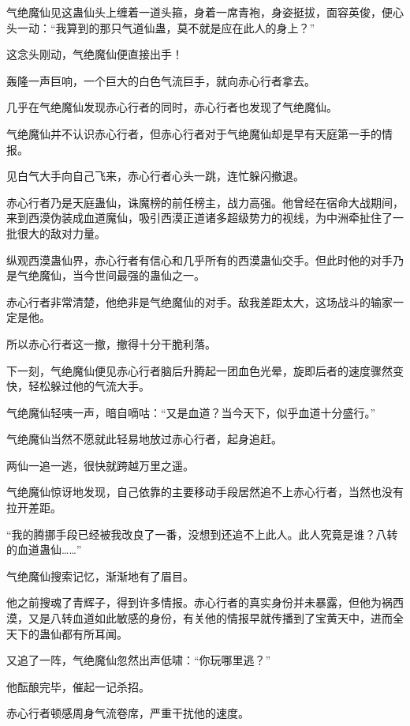 
\begin{this_body}

气绝魔仙见这蛊仙头上缠着一道头箍，身着一席青袍，身姿挺拔，面容英俊，便心头一动：“我算到的那只气道仙蛊，莫不就是应在此人的身上？”

这念头刚动，气绝魔仙便直接出手！

轰隆一声巨响，一个巨大的白色气流巨手，就向赤心行者拿去。

几乎在气绝魔仙发现赤心行者的同时，赤心行者也发现了气绝魔仙。

气绝魔仙并不认识赤心行者，但赤心行者对于气绝魔仙却是早有天庭第一手的情报。

见白气大手向自己飞来，赤心行者心头一跳，连忙躲闪撤退。

赤心行者乃是天庭蛊仙，诛魔榜的前任榜主，战力高强。他曾经在宿命大战期间，来到西漠伪装成血道魔仙，吸引西漠正道诸多超级势力的视线，为中洲牵扯住了一批很大的敌对力量。

纵观西漠蛊仙界，赤心行者有信心和几乎所有的西漠蛊仙交手。但此时他的对手乃是气绝魔仙，当今世间最强的蛊仙之一。

赤心行者非常清楚，他绝非是气绝魔仙的对手。敌我差距太大，这场战斗的输家一定是他。

所以赤心行者这一撤，撤得十分干脆利落。

下一刻，气绝魔仙便见赤心行者脑后升腾起一团血色光晕，旋即后者的速度骤然变快，轻松躲过他的气流大手。

气绝魔仙轻咦一声，暗自嘀咕：“又是血道？当今天下，似乎血道十分盛行。”

气绝魔仙当然不愿就此轻易地放过赤心行者，起身追赶。

两仙一追一逃，很快就跨越万里之遥。

气绝魔仙惊讶地发现，自己依靠的主要移动手段居然追不上赤心行者，当然也没有拉开差距。

“我的腾挪手段已经被我改良了一番，没想到还追不上此人。此人究竟是谁？八转的血道蛊仙……”

气绝魔仙搜索记忆，渐渐地有了眉目。

他之前搜魂了青辉子，得到许多情报。赤心行者的真实身份并未暴露，但他为祸西漠，又是八转血道如此敏感的身份，有关他的情报早就传播到了宝黄天中，进而全天下的蛊仙都有所耳闻。

又追了一阵，气绝魔仙忽然出声低啸：“你玩哪里逃？”

他酝酿完毕，催起一记杀招。

赤心行者顿感周身气流卷席，严重干扰他的速度。


\end{this_body}
